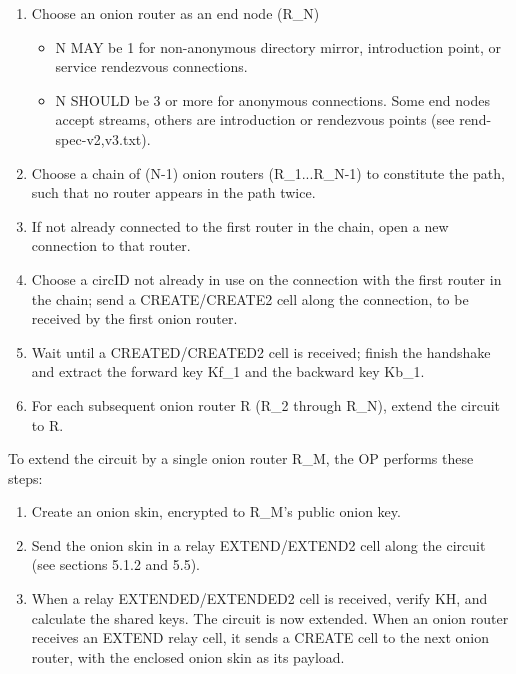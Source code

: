 \begin{enumerate}
    \item Choose an onion router as an end node (R\_N)
    \begin{itemize}
        \item N MAY be 1 for non-anonymous directory mirror, introduction point,
        or service rendezvous connections.
        \item N SHOULD be 3 or more for anonymous connections.
        Some end nodes accept streams, others are introduction
        or rendezvous points (see rend-spec-{v2,v3}.txt).
    \end{itemize}
    \item Choose a chain of (N-1) onion routers (R\_1...R\_N-1) to constitute
    the path, such that no router appears in the path twice.

    \item If not already connected to the first router in the chain,
    open a new connection to that router.

    \item Choose a circID not already in use on the connection with the
    first router in the chain; send a CREATE/CREATE2 cell along
    the connection, to be received by the first onion router.

    \item Wait until a CREATED/CREATED2 cell is received; finish the
    handshake and extract the forward key Kf\_1 and the backward
    key Kb\_1.

    \item For each subsequent onion router R (R\_2 through R\_N), extend
    the circuit to R.
\end{enumerate}

To extend the circuit by a single onion router R\_M, the OP performs
these steps:
\begin{enumerate}
    \item Create an onion skin, encrypted to R\_M's public onion key.

    \item Send the onion skin in a relay EXTEND/EXTEND2 cell along
    the circuit (see sections 5.1.2 and 5.5).

    \item When a relay EXTENDED/EXTENDED2 cell is received, verify KH,
    and calculate the shared keys. The circuit is now extended.
    When an onion router receives an EXTEND relay cell, it sends a CREATE
    cell to the next onion router, with the enclosed onion skin as its
    payload.
\end{enumerate}

